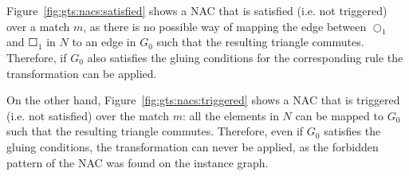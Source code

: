 \begin{example} Figure~\ref{fig:gts:nacs:satisfied} shows a NAC that is satisfied (i.e. not triggered) over a match $m$, as there is no possible way of mapping the edge between $\Circle_1$ and $\Square_1$ in $N$ to an edge in $G_0$ such that the resulting triangle commutes. Therefore, if $G_0$ also satisfies the gluing conditions for the corresponding rule the transformation can be applied.

  On the other hand, Figure~\ref{fig:gts:nacs:triggered} shows a NAC that is triggered (i.e. not satisfied) over the match $m$: all the elements in $N$ can be mapped to $G_0$ such that the resulting triangle commutes. Therefore, even if $G_0$ satisfies the gluing conditions, the transformation can never be applied, as the forbidden pattern of the NAC was found on the instance graph.


\end{example}
